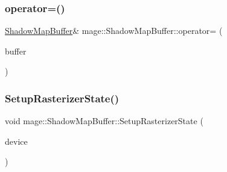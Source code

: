 \hypertarget{structmage_1_1_shadow_map_buffer_a7ecdf05195a56dbbfbe473df2aad6ba6}{}\label{structmage_1_1_shadow_map_buffer_a7ecdf05195a56dbbfbe473df2aad6ba6} 
\subsubsection{\texorpdfstring{operator=()}{operator=()}\hspace{0.1cm}{\footnotesize\ttfamily [2/2]}}
{\footnotesize\ttfamily \hyperlink{structmage_1_1_shadow_map_buffer}{Shadow\+Map\+Buffer}\& mage\+::\+Shadow\+Map\+Buffer\+::operator= (\begin{DoxyParamCaption}\item[{\hyperlink{structmage_1_1_shadow_map_buffer}{Shadow\+Map\+Buffer} \&\&}]{buffer }\end{DoxyParamCaption})\hspace{0.3cm}{\ttfamily [delete]}}

\hypertarget{structmage_1_1_shadow_map_buffer_a4cc23df062cfc02ab1b0fdbe1f56161e}{}\label{structmage_1_1_shadow_map_buffer_a4cc23df062cfc02ab1b0fdbe1f56161e} 
\subsubsection{\texorpdfstring{Setup\+Rasterizer\+State()}{SetupRasterizerState()}}
{\footnotesize\ttfamily void mage\+::\+Shadow\+Map\+Buffer\+::\+Setup\+Rasterizer\+State (\begin{DoxyParamCaption}\item[{I\+D3\+D11\+Device5 $\ast$}]{device }\end{DoxyParamCaption})\hspace{0.3cm}{\ttfamily [private]}}

\hypertarget{structmage_1_1_shadow_map_buffer_a1da4563b5dc84531f24df51e9e94e154}{}\label{structmage_1_1_shadow_map_buffer_a1da4563b5dc84531f24df51e9e94e154} 
